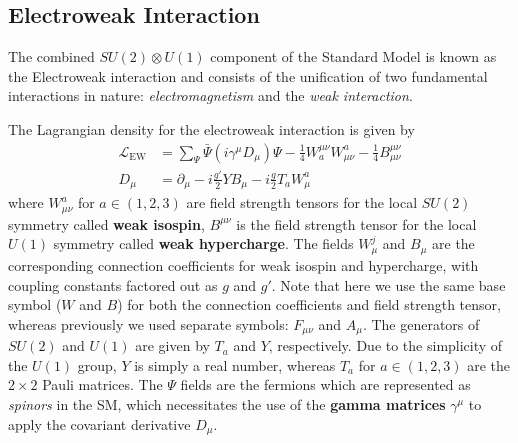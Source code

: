 \subsection{Electroweak Interaction}
The combined $SU(2) \otimes U(1)$ component of the Standard Model is known as the Electroweak interaction and consists of the unification of two fundamental interactions in nature: \textit{electromagnetism} and the \textit{weak interaction}.

The Lagrangian density for the electroweak interaction is given by
\begin{align}
    \mathcal{L}_{\mathrm{EW}} &= \sum_{\Psi}  \bar{\Psi}  (i \gamma^\mu D_\mu) \Psi - \frac{1}{4} W_a^{\mu\nu} W^a_{\mu\nu} - \frac{1}{4} B^{\mu\nu}_{\mu\nu} \\
    D_\mu &= \partial_\mu - i \frac{g'}{2} Y B_\mu - i \frac{g}{2} T_a W_\mu^a
\end{align}
where $W^a_{\mu\nu}$ for $a \in (1,2,3)$ are field strength tensors for the local $SU(2)$ symmetry called \textbf{weak isospin}, $B^{\mu\nu}$ is the field strength tensor for the local $U(1)$ symmetry called \textbf{weak hypercharge}.
The fields $W_\mu^j$ and $B_\mu$ are the corresponding connection coefficients for weak isospin and hypercharge, with coupling constants factored out as $g$ and $g'$. Note that here we use the same base symbol ($W$ and $B$) for both the connection coefficients and field strength tensor, whereas previously we used separate symbols: $F_{\mu\nu}$ and $A_\mu$.
The generators of $SU(2)$ and $U(1)$ are given by $T_a$ and $Y$, respectively.
Due to the simplicity of the $U(1)$ group, $Y$ is simply a real number, whereas $T_a$ for $a \in (1,2,3)$ are the $2\times2$ Pauli matrices.
The $\Psi$ fields are the fermions which are represented as \textit{spinors} in the SM, which necessitates the use of the \textbf{gamma matrices} $\gamma^\mu$ to apply the covariant derivative $D_\mu$.

